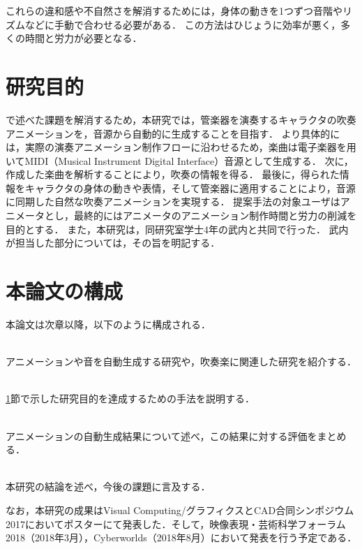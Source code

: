 これらの違和感や不自然さを解消するためには，身体の動きを1つずつ音階やリズムなどに手動で合わせる必要がある．
この方法はひじょうに効率が悪く，多くの時間と労力が必要となる．

\section{研究目的}\label{sec:purpose}
で述べた課題を解消するため，本研究では，管楽器を演奏するキャラクタの吹奏アニメーションを，音源から自動的に生成することを目指す．
より具体的には，実際の演奏アニメーション制作フローに沿わせるため，楽曲は電子楽器を用いてMIDI（Musical Instrument Digital Interface）音源として生成する．
次に，作成した楽曲を解析することにより，吹奏の情報を得る．
最後に，得られた情報をキャラクタの身体の動きや表情，そして管楽器に適用することにより，音源に同期した自然な吹奏アニメーションを実現する．
提案手法の対象ユーザはアニメータとし，最終的にはアニメータのアニメーション制作時間と労力の削減を目的とする．
また，本研究は，同研究室学士4年の武内と共同で行った．
武内が担当した部分については，その旨を明記する．

\section{本論文の構成}\label{sec:structure}
本論文は次章以降，以下のように構成される．
\begin{description}
	\setlength{\itemindent}{4pt}
	\item[第2章 関連研究] \mbox{}\\
	\hspace{3ex}アニメーションや音を自動生成する研究や，吹奏楽に関連した研究を紹介する．
	\item[第3章 提案手法] \mbox{}\\
	\hspace{3ex} \ref{sec:purpose}節で示した研究目的を達成するための手法を説明する．
	\item[第4章 自動生成結果と評価] \mbox{}\\
	\hspace{3ex} アニメーションの自動生成結果について述べ，この結果に対する評価をまとめる．
	\item[第5章 結論] \mbox{}\\
	\hspace{3ex} 本研究の結論を述べ，今後の課題に言及する．
\end{description}
\indent
なお，本研究の成果はVisual Computing/グラフィクスとCAD合同シンポジウム2017においてポスター\cite{vc}にて発表した．そして，映像表現・芸術科学フォーラム2018（2018年3月），Cyberworlds（2018年8月）において発表を行う予定である．